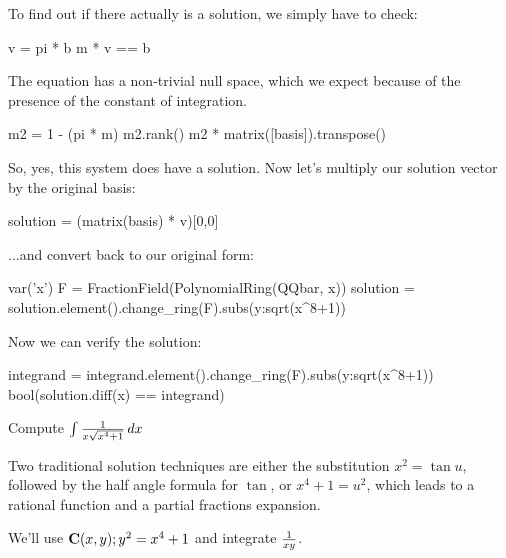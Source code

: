 To find out if there actually is a solution, we simply have to check:

\begin{sageblock}[riemannroch3]
v = pi * b
m * v == b
\end{sageblock}

The equation has a non-trivial null space, which we expect because
of the presence of the constant of integration.

\begin{sageblock}[riemannroch3]
m2 = 1 - (pi * m)
m2.rank()
m2 * matrix([basis]).transpose()
\end{sageblock}

So, yes, this system does have a solution.  Now let's multiply our
solution vector by the original basis:

\begin{sageblock}[riemannroch3]
solution = (matrix(basis) * v)[0,0]
\end{sageblock}

...and convert back to our original form:

\begin{sageblock}[riemannroch3]
var('x')
F = FractionField(PolynomialRing(QQbar, x))
solution = solution.element().change_ring(F).subs({y:sqrt(x^8+1)})
\end{sageblock}

Now we can verify the solution:

\begin{sageblock}[riemannroch3]
integrand = integrand.element().change_ring(F).subs({y:sqrt(x^8+1)})
bool(solution.diff(x) == integrand)
\end{sageblock}



\endexample


\vfill\eject
{}

\example Compute $\int {1\over{x\sqrt{x^4+1}}} \, dx$

Two traditional solution techniques are either the substitution $x^2 = \tan u$,
followed by the half angle formula for $\tan$, or $x^4+1=u^2$, which
leads to a rational function and a partial fractions expansion.

We'll use ${\bf C}(x,y); y^2=x^4+1$ and integrate ${1\over{xy}}$.

